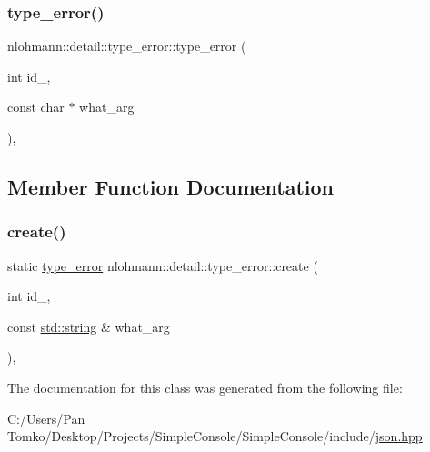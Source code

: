 \subsubsection{\texorpdfstring{type\_error()}{type\_error()}}
{\footnotesize\ttfamily nlohmann\+::detail\+::type\+\_\+error\+::type\+\_\+error (\begin{DoxyParamCaption}\item[{int}]{id\+\_\+,  }\item[{const char $\ast$}]{what\+\_\+arg }\end{DoxyParamCaption})\hspace{0.3cm}{\ttfamily [inline]}, {\ttfamily [private]}}



\subsection{Member Function Documentation}
\mbox{\label{classnlohmann_1_1detail_1_1type__error_aecc083aea4b698c33d042670ba50c10f}} 
\subsubsection{\texorpdfstring{create()}{create()}}
{\footnotesize\ttfamily static \mbox{\hyperlink{classnlohmann_1_1detail_1_1type__error}{type\+\_\+error}} nlohmann\+::detail\+::type\+\_\+error\+::create (\begin{DoxyParamCaption}\item[{int}]{id\+\_\+,  }\item[{const \mbox{\hyperlink{namespacenlohmann_1_1detail_a1ed8fc6239da25abcaf681d30ace4985ab45cffe084dd3d20d928bee85e7b0f21}{std\+::string}} \&}]{what\+\_\+arg }\end{DoxyParamCaption})\hspace{0.3cm}{\ttfamily [inline]}, {\ttfamily [static]}}



The documentation for this class was generated from the following file\+:\begin{DoxyCompactItemize}
\item 
C\+:/\+Users/\+Pan Tomko/\+Desktop/\+Projects/\+Simple\+Console/\+Simple\+Console/include/\mbox{\hyperlink{json_8hpp}{json.\+hpp}}\end{DoxyCompactItemize}
